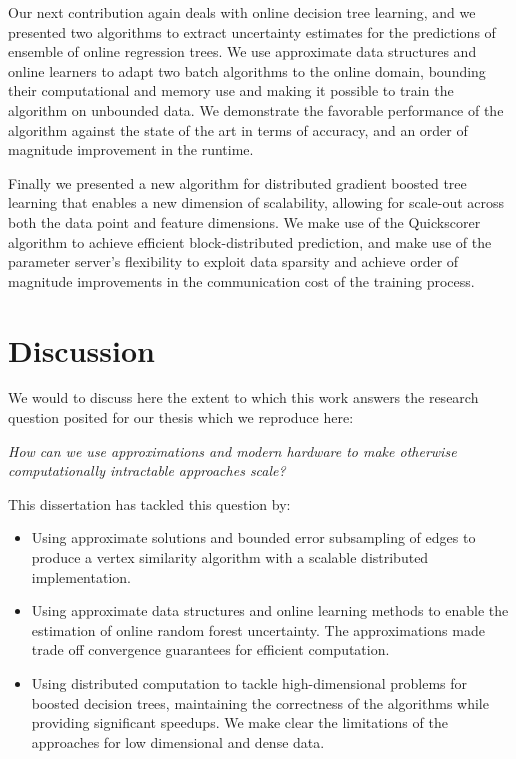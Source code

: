Our next contribution again deals with online decision tree learning,
and we presented two algorithms to extract uncertainty estimates
for the predictions of ensemble of online regression trees.
We use approximate data structures and online learners to
adapt two batch algorithms to the online domain, bounding
their computational and memory use and making it possible
to train the algorithm on unbounded data. We demonstrate the
favorable performance of the algorithm against the state of
the art in terms of accuracy, and an order of magnitude improvement
in the runtime.

Finally we presented a new algorithm for distributed gradient boosted tree
learning that enables a new dimension of scalability, allowing for scale-out
across both the data point and feature dimensions. We make use of the Quickscorer
algorithm to achieve efficient block-distributed prediction, and make use
of the parameter server's flexibility to exploit data sparsity and achieve
order of magnitude improvements in the communication cost of the training process.

\section{Discussion}

We would to discuss here the extent to which this work answers the research
question posited for our thesis which we reproduce here:

\begin{displayquote}
	\emph{How can we use approximations and modern hardware to make otherwise computationally intractable approaches scale?}
\end{displayquote}

\noindent
This dissertation has tackled this question by:
\begin{itemize}
	\item Using approximate solutions and bounded error subsampling of edges
	to produce a vertex similarity algorithm with a scalable
	distributed implementation.

	\item Using approximate data structures and online learning methods
	to enable the estimation of online random forest uncertainty. The approximations
	made trade off convergence guarantees for efficient computation.

	\item Using distributed computation to tackle high-dimensional problems
	for boosted decision trees, maintaining the correctness of the algorithms
	while providing significant speedups. We make clear the limitations
	of the approaches for low dimensional and dense data.
\end{itemize}


